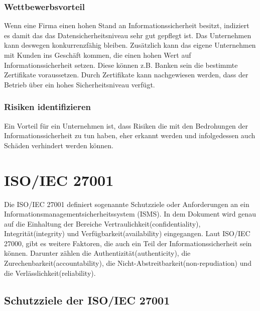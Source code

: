 \subsubsection{Wettbewerbsvorteil}
Wenn eine Firma einen hohen Stand an Informationssicherheit besitzt, indiziert es damit das das Datensicherheitsniveau sehr gut gepflegt ist. Das Unternehmen kann deswegen konkurrenzfähig bleiben. Zusätzlich kann das eigene Unternehmen mit Kunden ins Geschäft kommen, die einen hohen Wert auf Informationssicherheit setzen. Diese können z.B. Banken sein die bestimmte Zertifikate voraussetzen.
Durch Zertifikate kann nachgewiesen werden, dass der Betrieb über ein hohes Sicherheitsniveau verfügt.

\subsubsection{Risiken identifizieren}
Ein Vorteil für ein Unternehmen ist, dass Risiken die mit den Bedrohungen der Informationssicherheit zu tun haben, eher erkannt werden und infolgedessen auch Schäden verhindert werden können.

\section{ISO/IEC 27001}
Die ISO/IEC 27001 definiert sogenannte Schutzziele oder Anforderungen an ein Informationsmanagementsicherheitssystem (ISMS). In dem Dokument wird genau auf die Einhaltung der Bereiche Vertraulichkeit(confidentiality), Integrität(integrity) und Verfügbarkeit(availability) eingegangen. Laut ISO/IEC 27000, gibt es weitere Faktoren, die auch ein Teil der Informationssicherheit sein können. Darunter zählen die Authentizität(authenticity), die Zurechenbarkeit(accountability), die Nicht-Abstreitbarkeit(non-repudiation) und die Verlässlichkeit(reliability).

\subsection{Schutzziele der ISO/IEC 27001}
